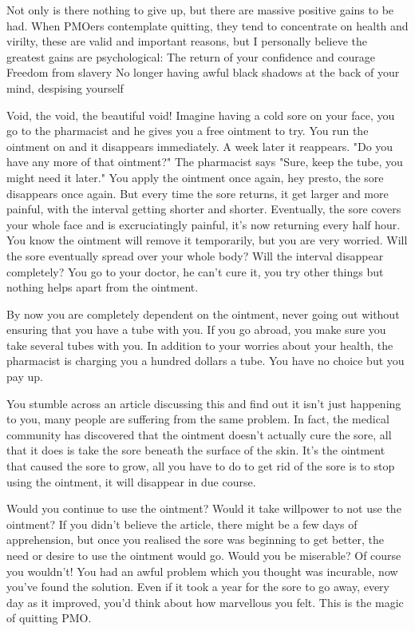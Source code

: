 Not only is there nothing to give up, but there are massive positive gains to be had. When PMOers contemplate quitting, they tend to concentrate on health and virilty, these are valid and important reasons, but I personally believe the greatest gains are psychological:
  The return of your confidence and courage
  Freedom from slavery
  No longer having awful black shadows at the back of your mind, despising yourself

Void, the void, the beautiful void!
Imagine having a cold sore on your face, you go to the pharmacist and he gives you a free ointment to try. You run the ointment on and it disappears immediately. A week later it reappears.
  "Do you have any more of that ointment?"
The pharmacist says "Sure, keep the tube, you might need it later."
You apply the ointment once again, hey presto, the sore disappears once again. But every time the sore returns, it get larger and more painful, with the interval getting shorter and shorter. Eventually, the sore covers your whole face and is excruciatingly painful, it's now returning every half hour. You know the ointment will remove it temporarily, but you are very worried. Will the sore eventually spread over your whole body? Will the interval disappear completely? You go to your doctor, he can't cure it, you try other things but nothing helps apart from the ointment.

By now you are completely dependent on the ointment, never going out without ensuring that you have a tube with you. If you go abroad, you make sure you take several tubes with you. In addition to your worries about your health, the pharmacist is charging you a hundred dollars a tube. You have no choice but you pay up.

You stumble across an article discussing this and find out it isn't just happening to you, many people are suffering from the same problem. In fact, the medical community has discovered that the ointment doesn't actually cure the sore, all that it does is take the sore beneath the surface of the skin. It's the ointment that caused the sore to grow, all you have to do to get rid of the sore is to stop using the ointment, it will disappear in due course.

Would you continue to use the ointment? Would it take willpower to not use the ointment? If you didn't believe the article, there might be a few days of apprehension, but once you realised the sore was beginning to get better, the need or desire to use the ointment would go. Would you be miserable? Of course you wouldn't! You had an awful problem which you thought was incurable, now you've found the solution. Even if it took a year for the sore to go away, every day as it improved, you'd think about how marvellous you felt. This is the magic of quitting PMO.

